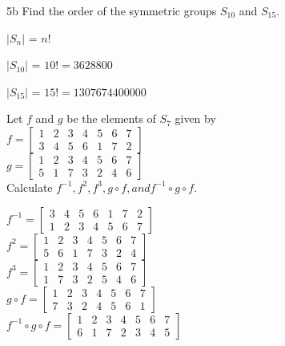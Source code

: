 \begin{question}{5b}
Find the order of the symmetric groups $S_{10}$ and $S_{15}$.

$|S_n|$ = $n!$

$|S_{10}|$ = $10! = 3628800$

$|S_{15}|$ = $15! = 1307674400000$

\end{question}


\begin{question}{6}
Let $f$ and $g$ be the elements of $S_7$ given by \\

$f= \begin{bmatrix}
1 & 2 & 3 & 4 & 5 & 6 & 7 \\
3 & 4 & 5 & 6 & 1 & 7 & 2
\end{bmatrix}
$\\

$g= \begin{bmatrix}
1 & 2 & 3 & 4 & 5 & 6 & 7 \\
5 & 1 & 7 & 3 & 2 & 4 & 6
\end{bmatrix}
$\\

Calculate $f^{-1}, f^2, f^3, g \circ f, and f^{-1} \circ g \circ f$.

$f^{-1}= \begin{bmatrix}
3 & 4 & 5 & 6 & 1 & 7 & 2 \\
1 & 2 & 3 & 4 & 5 & 6 & 7
\end{bmatrix}
$\\

$f^{2}= \begin{bmatrix}
1 & 2 & 3 & 4 & 5 & 6 & 7 \\
5 & 6 & 1 & 7 & 3 & 2 & 4
\end{bmatrix}
$\\

$f^{3}= \begin{bmatrix}
1 & 2 & 3 & 4 & 5 & 6 & 7 \\
1 & 7 & 3 & 2 & 5 & 4 & 6
\end{bmatrix}
$\\

$g \circ f = \begin{bmatrix}
1 & 2 & 3 & 4 & 5 & 6 & 7 \\
7 & 3 & 2 & 4 & 5 & 6 & 1
\end{bmatrix}
$\\

$f^{-1} \circ g \circ f = \begin{bmatrix}
1 & 2 & 3 & 4 & 5 & 6 & 7 \\
6 & 1 & 7 & 2 & 3 & 4 & 5
\end{bmatrix}
$\\
\end{question}

